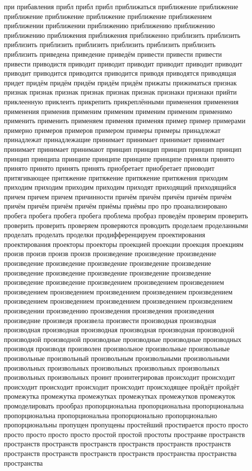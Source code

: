 при прибавления прибл прибл прибл приближаться приближение приближение приближение приближение приближение приближение приближением приближении приближении приближению приближению приближению приближению приближения приближения приближенно приблизить приблизить приблизить приблизить приблизить приблизить приблизить приблизить приблизить приведена приведение приведём привести привести привести привести приводистя приводит приводит приводит приводит приводит приводит приводит приводится приводится приводится приводя приводятся приводящая придет придём придём придём придём придём прижаты прижиматься признак признак признак признак признак признак признак признаки признаки прийти приклеенную приклеить прикрепить прикреплёнными применения применения применения применив применим применим применим применим применимо применить применить применяем применяя применяя пример пример примерами примерно примеров примеров примером примеры примеры принадлежат принадлежат принадлежащие принимает принимает принимает принимает принимает принимает принимают принцип принцип принцип принцип принцип принцип принципа принципе принципе принципе принципе приняли принято принято принято принять принять приобретает приобретает приоводит притягивающее притяжение притяжение притяжение притяжения приходим приходим приходим приходим приходим приходят приходящий приходящийся причем причем причем причинности причём причём причём причём причём причём причём причём причём приёмы приёмы про про проанализировано пробега пробега пробега пробега проблема пробраз проведём проверим проверить проверить проверить проверяем проверяются проводить проделаем проделанными проделать проделать проделки продифференцируем проектирования проектирования проекторы проекторы проекцией проекции проекция проекциям произв произв произв произв произведение произведение произведение произведение произведение произведение произведение произведение произведение произведение произведение произведение произведение произведение произведение произведением произведением произведением произведением произведением произведением произведением произведением произведением произведением произведением произведением произведением произведении произведению произведения произведения произведения произведние произведя произвела произвести производная производная производная производная производная производная производная производной производной производной производные производные производные производных производя производя произволен произвольное произвольные произвольные произвольные произвольный произвольным произвольными произвольными произвольных произвольных произвольных произвольных произвольных произвольных произвольных проинт проинтегрировав происходит происходит происходит происходит происходит происходит происходящее пройдёт пройдёт промежутка промежутка промежутках промежутках промежутков промежуток промоделировать прообраз пропорциональна пропорциональна пропорциональна пропорциональна пропорциональна пропорционально пропорционально пропорциональны пропущен пропущены простейший простирается просто просто просто просто просто просто простой простой простоты пространве пространств пространств пространств пространств пространств пространств пространств пространств пространств пространств пространств пространства пространства пространства 